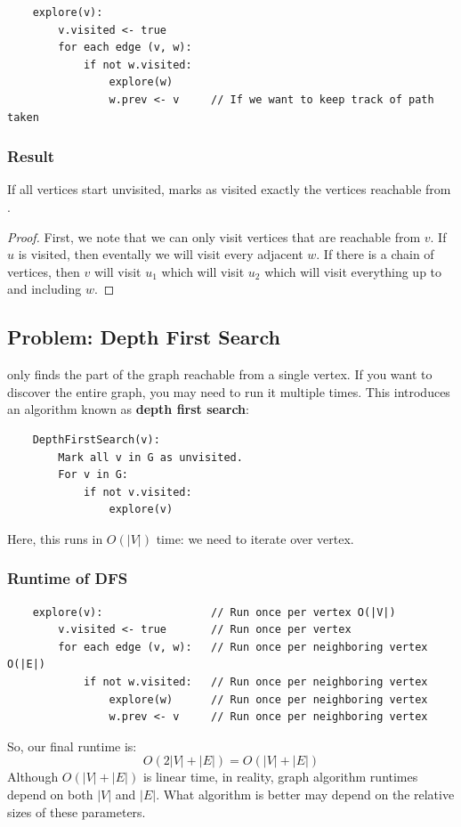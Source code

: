 \documentclass[letterpaper]{article}
\begin{document}
\begin{verbatim}
    explore(v):
        v.visited <- true 
        for each edge (v, w):
            if not w.visited:
                explore(w)
                w.prev <- v     // If we want to keep track of path taken
\end{verbatim}

\subsubsection{Result}
\begin{theorem}{}{}
    If all vertices start unvisited,  marks as visited exactly the vertices reachable from .
\end{theorem}

\begin{mdframed}[]
    \begin{proof}
        First, we note that we can only visit vertices that are reachable from $v$. If $u$ is visited, then eventally we will visit every adjacent $w$. If there is a chain of vertices, then $v$ will visit $u_1$ which will visit $u_2$ which will visit everything up to and including $w$. 
    \end{proof}
\end{mdframed}

\subsection{Problem: Depth First Search}
 only finds the part of the graph reachable from a single vertex. If you want to discover the entire graph, you may need to run it multiple times. This introduces an algorithm known as \textbf{depth first search}:
\begin{verbatim}
    DepthFirstSearch(v):
        Mark all v in G as unvisited. 
        For v in G:
            if not v.visited:
                explore(v)
\end{verbatim}
Here, this runs in $O(|V|)$ time: we need to iterate over vertex. 

\subsubsection{Runtime of DFS}
\begin{verbatim}
    explore(v):                 // Run once per vertex O(|V|) 
        v.visited <- true       // Run once per vertex 
        for each edge (v, w):   // Run once per neighboring vertex O(|E|)
            if not w.visited:   // Run once per neighboring vertex
                explore(w)      // Run once per neighboring vertex
                w.prev <- v     // Run once per neighboring vertex
\end{verbatim}
So, our final runtime is: 
\[O(2|V| + |E|) = O(|V| + |E|)\]
Although $O(|V| + |E|)$ is linear time, in reality, graph algorithm runtimes depend on both $|V|$ and $|E|$. What algorithm is better may depend on the relative sizes of these parameters.
\end{document}
